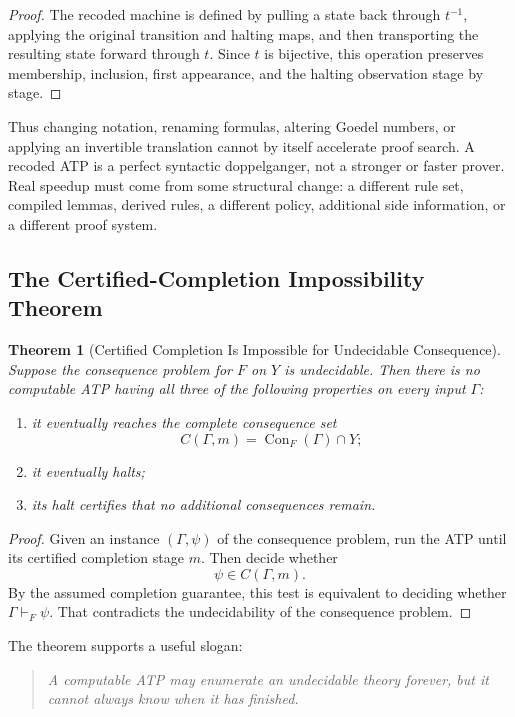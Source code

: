 \documentclass[11pt,letterpaper]{article}
\theoremstyle{named}
\newtheorem{theorem}{Theorem}[section]
\newcommand{\Con}{\operatorname{Con}}
\begin{document}
\begin{proof}
The recoded machine is defined by pulling a state back through $t^{-1}$, applying the original transition and halting maps, and then transporting the resulting state forward through $t$. Since $t$ is bijective, this operation preserves membership, inclusion, first appearance, and the halting observation stage by stage.
\end{proof}

Thus changing notation, renaming formulas, altering Goedel numbers, or applying an invertible translation cannot by itself accelerate proof search. A recoded ATP is a perfect syntactic doppelganger, not a stronger or faster prover. Real speedup must come from some structural change: a different rule set, compiled lemmas, derived rules, a different policy, additional side information, or a different proof system.

\subsection{The Certified-Completion Impossibility Theorem}

\begin{theorem}[Certified Completion Is Impossible for Undecidable Consequence]
Suppose the consequence problem for $F$ on $Y$ is undecidable. Then there is no computable ATP having all three of the following properties on every input $\Gamma$:
\begin{enumerate}
\item it eventually reaches the complete consequence set
\[
C(\Gamma,m)=\Con_F(\Gamma)\cap Y;
\]
\item it eventually halts;
\item its halt certifies that no additional consequences remain.
\end{enumerate}
\end{theorem}

\begin{proof}
Given an instance $(\Gamma,\psi)$ of the consequence problem, run the ATP until its certified completion stage $m$. Then decide whether
\[
\psi\in C(\Gamma,m).
\]
By the assumed completion guarantee, this test is equivalent to deciding whether $\Gamma\vdash_F\psi$. That contradicts the undecidability of the consequence problem.
\end{proof}

The theorem supports a useful slogan:

\begin{quote}
\emph{A computable ATP may enumerate an undecidable theory forever, but it cannot always know when it has finished.}
\end{quote}
\end{document}
